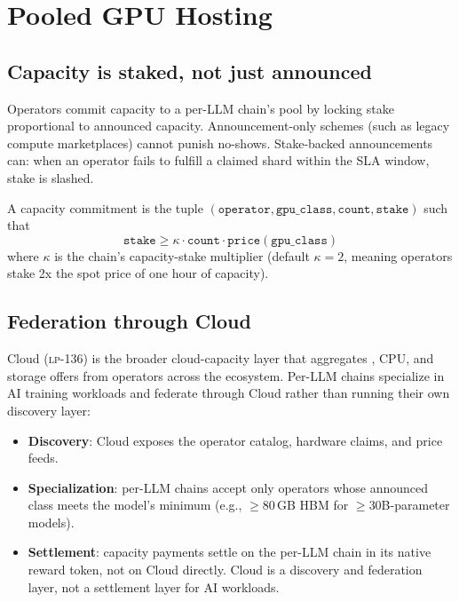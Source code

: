 \section{Pooled GPU Hosting}
\label{sec:gpu}

\subsection{Capacity is staked, not just announced}

Operators commit \GPU{} capacity to a per-LLM chain's pool by locking stake proportional to announced capacity. Announcement-only schemes (such as legacy compute marketplaces) cannot punish no-shows. Stake-backed announcements can: when an operator fails to fulfill a claimed shard within the SLA window, stake is slashed.

\begin{definition}
A capacity commitment is the tuple $(\texttt{operator}, \texttt{gpu\_class}, \texttt{count}, \texttt{stake})$ such that
\[
\texttt{stake} \ge \kappa \cdot \texttt{count} \cdot \texttt{price}(\texttt{gpu\_class})
\]
where $\kappa$ is the chain's capacity-stake multiplier (default $\kappa = 2$, meaning operators stake 2x the spot price of one hour of capacity).
\end{definition}

\subsection{Federation through \Lux{} Cloud}

\Lux{} Cloud (\textsc{lp-136}) is the broader cloud-capacity layer that aggregates \GPU{}, CPU, and storage offers from operators across the \Lux{} ecosystem. Per-LLM chains specialize in AI training workloads and federate through \Lux{} Cloud rather than running their own discovery layer:

\begin{itemize}[nosep]
\item \textbf{Discovery}: \Lux{} Cloud exposes the operator catalog, hardware claims, and price feeds.
\item \textbf{Specialization}: per-LLM chains accept only operators whose announced \GPU{} class meets the model's minimum (e.g., $\ge$80\,GB HBM for $\ge$30B-parameter models).
\item \textbf{Settlement}: capacity payments settle on the per-LLM chain in its native reward token, not on \Lux{} Cloud directly. \Lux{} Cloud is a discovery and federation layer, not a settlement layer for AI workloads.
\end{itemize}

